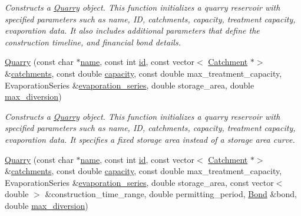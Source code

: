 \begin{DoxyCompactItemize}
\begin{DoxyCompactList}\small\item\em Constructs a \mbox{\hyperlink{classQuarry}{Quarry}} object. This function initializes a quarry reservoir with specified parameters such as name, ID, catchments, capacity, treatment capacity, evaporation data. It also includes additional parameters that define the construction timeline, and financial bond details. \end{DoxyCompactList}\item 
\mbox{\hyperlink{classQuarry_a28c4db26230c2ff3f82c8c0f70f2f124}{Quarry}} (const char $\ast$\mbox{\hyperlink{classWaterSource_a846ea74c5b453d014f594d41fee8c765}{name}}, const int \mbox{\hyperlink{classWaterSource_a6eafe5dfefd317877d1244e8a7c6e742}{id}}, const vector$<$ \mbox{\hyperlink{classCatchment}{Catchment}} $\ast$$>$ \&\mbox{\hyperlink{classWaterSource_a8c18c34f23f8a06685c1d12f462ed830}{catchments}}, const double \mbox{\hyperlink{classWaterSource_a2ec257b415b248214a8bce7fc5267723}{capacity}}, const double max\+\_\+treatment\+\_\+capacity, Evaporation\+Series \&\mbox{\hyperlink{classReservoir_a2d2d9b302c13703309bb798d24136810}{evaporation\+\_\+series}}, double storage\+\_\+area, double \mbox{\hyperlink{classQuarry_a5cb60f94475d5991a795cb9117e0b83f}{max\+\_\+diversion}})
\begin{DoxyCompactList}\small\item\em Constructs a \mbox{\hyperlink{classQuarry}{Quarry}} object. This function initializes a quarry reservoir with specified parameters such as name, ID, catchments, capacity, treatment capacity, evaporation data. It specifies a fixed storage area instead of a storage area curve. \end{DoxyCompactList}\item 
\mbox{\hyperlink{classQuarry_a561616791620a55709bfca645bc8cbad}{Quarry}} (const char $\ast$\mbox{\hyperlink{classWaterSource_a846ea74c5b453d014f594d41fee8c765}{name}}, const int \mbox{\hyperlink{classWaterSource_a6eafe5dfefd317877d1244e8a7c6e742}{id}}, const vector$<$ \mbox{\hyperlink{classCatchment}{Catchment}} $\ast$$>$ \&\mbox{\hyperlink{classWaterSource_a8c18c34f23f8a06685c1d12f462ed830}{catchments}}, const double \mbox{\hyperlink{classWaterSource_a2ec257b415b248214a8bce7fc5267723}{capacity}}, const double max\+\_\+treatment\+\_\+capacity, Evaporation\+Series \&\mbox{\hyperlink{classReservoir_a2d2d9b302c13703309bb798d24136810}{evaporation\+\_\+series}}, double storage\+\_\+area, const vector$<$ double $>$ \&construction\+\_\+time\+\_\+range, double permitting\+\_\+period, \mbox{\hyperlink{classBond}{Bond}} \&bond, double \mbox{\hyperlink{classQuarry_a5cb60f94475d5991a795cb9117e0b83f}{max\+\_\+diversion}})

\end{DoxyCompactItemize}

